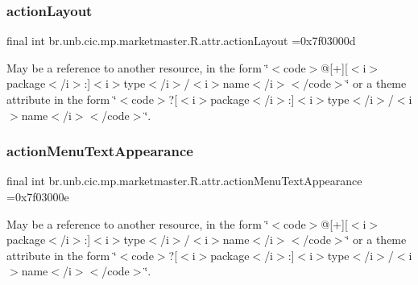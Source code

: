 \subsubsection{\texorpdfstring{action\+Layout}{actionLayout}}
{\footnotesize\ttfamily final int br.\+unb.\+cic.\+mp.\+marketmaster.\+R.\+attr.\+action\+Layout =0x7f03000d\hspace{0.3cm}{\ttfamily [static]}}

May be a reference to another resource, in the form \char`\"{}$<$code$>$@\mbox{[}+\mbox{]}\mbox{[}$<$i$>$package$<$/i$>$\+:\mbox{]}$<$i$>$type$<$/i$>$/$<$i$>$name$<$/i$>$$<$/code$>$\char`\"{} or a theme attribute in the form \char`\"{}$<$code$>$?\mbox{[}$<$i$>$package$<$/i$>$\+:\mbox{]}$<$i$>$type$<$/i$>$/$<$i$>$name$<$/i$>$$<$/code$>$\char`\"{}. \mbox{\label{classbr_1_1unb_1_1cic_1_1mp_1_1marketmaster_1_1R_1_1attr_ae017e985da02fc339e41aa75530c96c4}} 
\subsubsection{\texorpdfstring{action\+Menu\+Text\+Appearance}{actionMenuTextAppearance}}
{\footnotesize\ttfamily final int br.\+unb.\+cic.\+mp.\+marketmaster.\+R.\+attr.\+action\+Menu\+Text\+Appearance =0x7f03000e\hspace{0.3cm}{\ttfamily [static]}}

May be a reference to another resource, in the form \char`\"{}$<$code$>$@\mbox{[}+\mbox{]}\mbox{[}$<$i$>$package$<$/i$>$\+:\mbox{]}$<$i$>$type$<$/i$>$/$<$i$>$name$<$/i$>$$<$/code$>$\char`\"{} or a theme attribute in the form \char`\"{}$<$code$>$?\mbox{[}$<$i$>$package$<$/i$>$\+:\mbox{]}$<$i$>$type$<$/i$>$/$<$i$>$name$<$/i$>$$<$/code$>$\char`\"{}. \mbox{\label{classbr_1_1unb_1_1cic_1_1mp_1_1marketmaster_1_1R_1_1attr_a32456454d774b1c337db3465adca0123}} 
